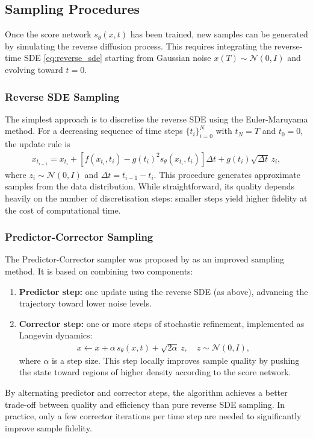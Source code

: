 \documentclass[a4paper,12pt]{article}
\begin{document}
\subsection{Sampling Procedures}
Once the score network \(s_\theta(x,t)\) has been trained, new samples can be generated by simulating the reverse diffusion process. This requires integrating the reverse-time SDE \eqref{eq:reverse_sde} starting from Gaussian noise \(x(T) \sim \mathcal{N}(0,I)\) and evolving toward \(t=0\).

\subsubsection{Reverse SDE Sampling}
The simplest approach is to discretise the reverse SDE using the Euler-Maruyama method. 
For a decreasing sequence of time steps \(\{t_i\}_{i=0}^N\) with \(t_N = T\) and \(t_0 = 0\), the update rule is
\begin{align*}
    x_{t_{i-1}} = x_{t_i} + \left[f(x_{t_i},t_i) - g(t_i)^2 s_\theta(x_{t_i},t_i)\right]\Delta t + g(t_i)\sqrt{\Delta t}\,z_i,
\end{align*}
where \(z_i \sim \mathcal{N}(0,I)\) and \(\Delta t = t_{i-1} - t_i\). This procedure generates approximate samples from the data distribution. While straightforward, its quality depends heavily on the number of discretisation steps: smaller steps yield higher fidelity at the cost of computational time.

\subsubsection{Predictor-Corrector Sampling}
The Predictor-Corrector sampler was proposed by \cite{song2021ScoreBasedGenerativeModeling} as an improved sampling method. It is based on combining two components:
\begin{enumerate}
  \item \textbf{Predictor step:} one update using the reverse SDE (as above), advancing the trajectory toward lower noise levels.  
  \item \textbf{Corrector step:} one or more steps of stochastic refinement, implemented as Langevin dynamics:
    \begin{align*}
        x \leftarrow x + \alpha\, s_\theta(x,t) + \sqrt{2\alpha}\,z, \quad z \sim \mathcal{N}(0,I),
    \end{align*}
    where \(\alpha\) is a step size. This step locally improves sample quality by pushing the state toward regions of higher density according to the score network.
\end{enumerate}
By alternating predictor and corrector steps, the algorithm achieves a better trade-off between quality and efficiency than pure reverse SDE sampling. 
In practice, only a few corrector iterations per time step are needed to significantly improve sample fidelity.
\end{document}
